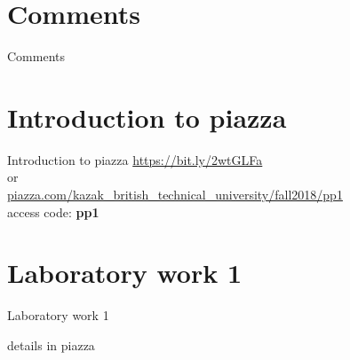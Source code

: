 \documentclass{beamer}
\begin{document}
    \section{Comments}
    \begin{frame}{Comments}
      
    \end{frame}
       \section{Introduction to piazza}
    \begin{frame}{Introduction to piazza}
      \url{https://bit.ly/2wtGLFa}\\
        or\\
      \url{piazza.com/kazak_british_technical_university/fall2018/pp1}\\
      access code: \textbf{pp1}\\
    \end{frame}

    \section{Laboratory work 1}
    \begin{frame}{Laboratory work 1}
    \end{frame}
      details in piazza\\
    
\end{document}
